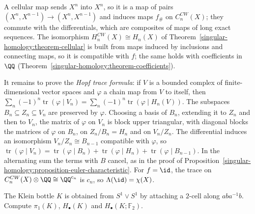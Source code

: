 \begin{solution}
A cellular map sends $X^n$ into $X^n$, so it is a map of pairs $(X^n, X^{n-1}) \to (X^n, X^{n-1})$ and induces maps $f_\#$ on $C^{CW}_n(X)$; they commute with the
differentials, which are composites of maps of long exact sequences. The isomorphism $H^{CW}_n(X) \cong H_n(X)$ of Theorem~\ref{singular-homology:theorem-cellular} is built
from maps induced by inclusions and connecting maps, so it is compatible with $f$; the same holds with coefficients in $\QQ$ (Theorem~\ref{singular-homology:theorem-coefficients}).

It remains to prove the \emph{Hopf trace formula}: if $V$ is a bounded complex of finite-dimensional vector spaces and $\varphi$ a chain map from $V$ to itself, then
$\sum_n(-1)^n\operatorname{tr}(\varphi \mid V_n) = \sum_n(-1)^n\operatorname{tr}(\varphi \mid H_n(V))$. The subspaces $B_n \subseteq Z_n \subseteq V_n$ are preserved by $\varphi$.
Choosing a basis of $B_n$, extending it to $Z_n$ and then to $V_n$, the matrix of $\varphi$ on $V_n$ is block upper triangular, with diagonal blocks the matrices of $\varphi$
on $B_n$, on $Z_n/B_n = H_n$ and on $V_n/Z_n$. The differential induces an isomorphism $V_n/Z_n \cong B_{n-1}$ compatible with $\varphi$, so
$\operatorname{tr}(\varphi \mid V_n) = \operatorname{tr}(\varphi \mid B_n) + \operatorname{tr}(\varphi \mid H_n) + \operatorname{tr}(\varphi \mid B_{n-1})$. In the alternating sum the
terms with $B$ cancel, as in the proof of Proposition~\ref{singular-homology:proposition-euler-characteristic}. For $f = \id$, the trace on $C^{CW}_n(X) \otimes \QQ \cong \QQ^{c_n}$ is
$c_n$, so $\Lambda(\id) = \chi(X)$.
\end{solution}

\begin{exercise}\label{singular-homology:exercise-klein-bottle}
The Klein bottle $K$ is obtained from $S^1 \vee S^1$ by attaching a $2$-cell along $aba^{-1}b$. Compute $\pi_1(K)$, $H_\bullet(K)$ and $H_\bullet(K; \mathbb{F}_2)$.
\end{exercise}

